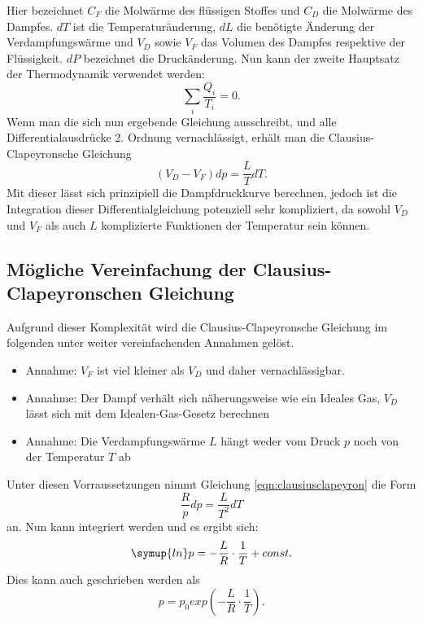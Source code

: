     Hier bezeichnet $C_{F}$ die Molwärme des flüssigen Stoffes und $C_{D}$ die Molwärme des Dampfes. $dT$ ist die
    Temperaturänderung, $dL$ die benötigte Änderung der Verdampfungswärme und $V_{D}$ sowie $V_{F}$ das Volumen des Dampfes
    respektive der Flüssigkeit. $dP$ bezeichnet die Druckänderung. Nun kann der zweite Hauptsatz der Thermodynamik verwendet
    werden:
    \begin{equation*}
      \label{eqn:zweiterhauptsatz}
      \sum_{i}^{} \frac{Q_{i}}{T_{i}} = 0.
    \end{equation*}
    Wenn man die sich nun ergebende Gleichung ausschreibt, und alle Differentialausdrücke 2. Ordnung vernachlässigt, erhält man
    die Clausius-Clapeyronsche Gleichung
    \begin{equation}
      \label{eqn:clausiusclapeyron}
      (V_{D} - V_{F})dp = \frac{L}{T} dT.
    \end{equation}
    Mit dieser lässt sich prinzipiell die Dampfdruckkurve berechnen, jedoch ist die Integration dieser Differentialgleichung
    potenziell sehr kompliziert, da sowohl $V_{D}$ und $V_{F}$ als auch $L$ komplizierte Funktionen der Temperatur sein können.
    \subsection{Mögliche Vereinfachung der Clausius-Clapeyronschen Gleichung}
    Aufgrund dieser Komplexität wird die Clausius-Clapeyronsche Gleichung im folgenden unter weiter vereinfachenden Annahmen
    gelöst.
    \begin{itemize}
      \item Annahme: $V_{F}$ ist viel kleiner als $V_{D}$ und daher vernachlässigbar.
      \item Annahme: Der Dampf verhält sich näherungsweise wie ein Ideales Gas, $V_{D}$ lässt sich mit dem Idealen-Gas-Gesetz
      berechnen
      \item Annahme: Die Verdampfungswärme $L$ hängt weder vom Druck $p$ noch von der Temperatur $T$ ab
    \end{itemize}
    Unter diesen Vorraussetzungen nimmt Gleichung \eqref{eqn:clausiusclapeyron} die Form
    \begin{equation*}
      \frac{R}{p} dp = \frac{L}{T^{2}} dT
    \end{equation*}
    an. Nun kann integriert werden und es ergibt sich:
    \begin{equation}
      \label{clausiusclapeyronintegriertln}
      \symup{ln}p = - \frac{L}{R} \cdot \frac{1}{T} + const.
    \end{equation}
    Dies kann auch geschrieben werden als
    \begin{equation}
      \label{clausiusclapeyronintegriertexp}
      p = p_{0} exp(- \frac{L}{R} \cdot \frac{1}{T}).
    \end{equation}
\label{sec:Theorie}
